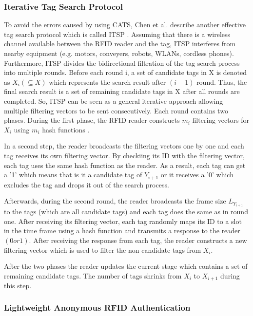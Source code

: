 \subsubsection{Iterative Tag Search Protocol}

To avoid the errors caused by using CATS, Chen et al. describe another effective tag search protocol which is called \ac{ITSP} \cite[p.22-28]{chen}. Assuming that there is a wireless channel available between the RFID reader and the tag, ITSP interferes from nearby equipment (e.g. motors, conveyers, robots, WLANs, cordless phones). Furthermore, ITSP divides the bidirectional filtration of the tag search process into multiple rounds. Before each round i, a set of candidate tags in X is denoted as $X_{i}(\subseteq X)$ which represents the search result after $(i-1)$ round. Thus, the final search result is a set of remaining candidate tags in X after all rounds are completed. So, ITSP can be seen as a general iterative approach allowing multiple filtering vectors to be sent consecutively. Each round contains two phases. During the first phase, the RFID reader constructs $m_{i}$ filtering vectors for $X_{i}$ using $m_{i}$ hash functions \cite[p.22]{chen}. 

In a second step, the reader broadcasts the filtering vectors one by one and each tag receives its own filtering vector. By checkiing its ID with the filtering vector, each tag uses the same hash function as the reader. As a result, each tag can get a '1' which means that is it a candidate tag of $Y_{i+1}$  or it receives a '0' which excludes the tag and drops it out of the search process.

Afterwards, during the second round, the reader broadcasts the frame size $L_{Y_{i+1}}$ to the tags (which are all candidate tags) and each tag does the same as in round one. After receiving its filtering vector, each tag randomly maps its ID to a slot in the time frame using a hash function and transmits a response to the reader $(0 or 1)$. After receiving the response from each tag, the reader constructs a new filtering vector which is used to filter the non-candidate tags from $X_{i}$.

After the two phases the reader updates the current stage which contains a set of remaining candidate tags. The number of tags shrinks from $X_{i}$ to $X_{i+1}$ during this step. 

\subsubsection{Lightweight Anonymous RFID Authentication}

